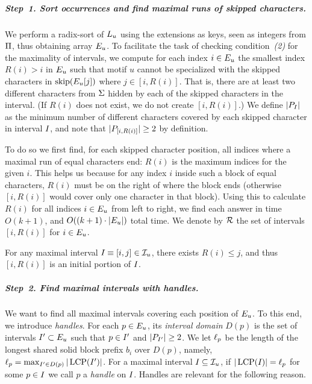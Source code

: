 \subparagraph*{Step~1. Sort occurrences and find maximal runs of skipped characters.} 
%
We perform a radix-sort of $L_{u}$ using the extensions as keys, seen as integers from $\Pi$, thus obtaining array $E_{u}$. To facilitate the task of checking condition~\emph{(2)} for the maximality of intervals, we compute for each index $i \in E_{u}$ 
the smallest index $R(i) > i$ in $E_{u}$ such that motif $u$ cannot be specialized with the skipped characters in $\operatorname{skip}(E_{u}[j])$ where $j \in [i, R(i)]$. That is, there are at least two different characters from $\Sigma$ hidden by each of the skipped characters in the interval. (If $R(i)$ does not exist, we do not create $[i, R(i)]$.)
We define $|P_{I_{}}|$ as the minimum number of different characters covered by each skipped character in interval $I_{}$, and note that $|P_{[i, R(i)]}| \geq 2$ by definition. 

To do so we first find, for each skipped character position, all indices where a maximal run of equal characters end: $R(i)$ is the maximum indices for the given $i$. This helps us because for any index $i$ inside such a block of equal characters, $R(i)$ must be on the right of where the block ends (otherwise $[i, R(i)]$ would cover only one character in that block). 
Using this to calculate $R(i)$ for all indices $i \in E_{u}$ from left to right, we find each answer in time $O(k+1)$, and $O((k+1) \cdot |E_{u}|)$ total time. We denote by $\mathcal{R}$ the set of intervals $[i, R(i)]$ for $i \in E_{u}$. 

\begin{lemma}
  \label{lemma:R-prefix}
  For any maximal interval $I_{} \equiv [i,j] \in \mathcal{I}_{u}$, there exists $R(i) \leq j$, and thus $[i,R(i)]$ is an initial portion of $I_{}$.
\end{lemma}

\subparagraph*{Step~2. Find maximal intervals with handles.}
%

We want to find all maximal intervals covering each position of $E_{u}$. To this end, we introduce \emph{handles}. 
For each $p \in E_{u}$, its \emph{interval domain} $D(p)$ is the set of intervals $I_{}' \subset E_{u}$ such that $p \in I_{}'$ and $|P_{I_{}'}| \geq 2$.
We let $\operatorname{\ell}_{p}$ be the length of the longest shared solid block prefix $b_i$ over $D(p)$, namely, $\operatorname{\ell}_{p} = \max_{I_{}' \in D(p)} |\operatorname{LCP}(I_{}')|$. For a maximal interval $I_{} \subseteq \mathcal{I}_{u}$, if $|\operatorname{LCP}(I_{})| = \operatorname{\ell}_{p}$ for some $p \in I_{}$ we call $p$ a \emph{handle} on $I_{}$. Handles are relevant for the following reason.

